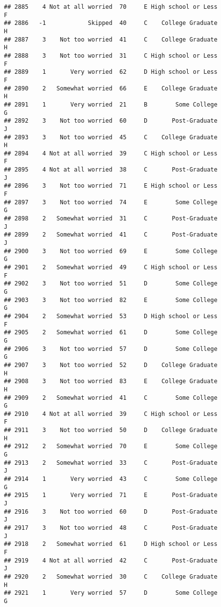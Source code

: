 \documentclass[
]{article}
\begin{document}
\begin{verbatim}
## 2885    4 Not at all worried  70     E High school or Less         F
## 2886   -1            Skipped  40     C    College Graduate         H
## 2887    3    Not too worried  41     C    College Graduate         H
## 2888    3    Not too worried  31     C High school or Less         F
## 2889    1       Very worried  62     D High school or Less         F
## 2890    2   Somewhat worried  66     E    College Graduate         H
## 2891    1       Very worried  21     B        Some College         G
## 2892    3    Not too worried  60     D       Post-Graduate         J
## 2893    3    Not too worried  45     C    College Graduate         H
## 2894    4 Not at all worried  39     C High school or Less         F
## 2895    4 Not at all worried  38     C       Post-Graduate         J
## 2896    3    Not too worried  71     E High school or Less         F
## 2897    3    Not too worried  74     E        Some College         G
## 2898    2   Somewhat worried  31     C       Post-Graduate         J
## 2899    2   Somewhat worried  41     C       Post-Graduate         J
## 2900    3    Not too worried  69     E        Some College         G
## 2901    2   Somewhat worried  49     C High school or Less         F
## 2902    3    Not too worried  51     D        Some College         G
## 2903    3    Not too worried  82     E        Some College         G
## 2904    2   Somewhat worried  53     D High school or Less         F
## 2905    2   Somewhat worried  61     D        Some College         G
## 2906    3    Not too worried  57     D        Some College         G
## 2907    3    Not too worried  52     D    College Graduate         H
## 2908    3    Not too worried  83     E    College Graduate         H
## 2909    2   Somewhat worried  41     C        Some College         G
## 2910    4 Not at all worried  39     C High school or Less         F
## 2911    3    Not too worried  50     D    College Graduate         H
## 2912    2   Somewhat worried  70     E        Some College         G
## 2913    2   Somewhat worried  33     C       Post-Graduate         J
## 2914    1       Very worried  43     C        Some College         G
## 2915    1       Very worried  71     E       Post-Graduate         J
## 2916    3    Not too worried  60     D       Post-Graduate         J
## 2917    3    Not too worried  48     C       Post-Graduate         J
## 2918    2   Somewhat worried  61     D High school or Less         F
## 2919    4 Not at all worried  42     C       Post-Graduate         J
## 2920    2   Somewhat worried  30     C    College Graduate         H
## 2921    1       Very worried  57     D        Some College         G

\end{verbatim}
\end{document}
